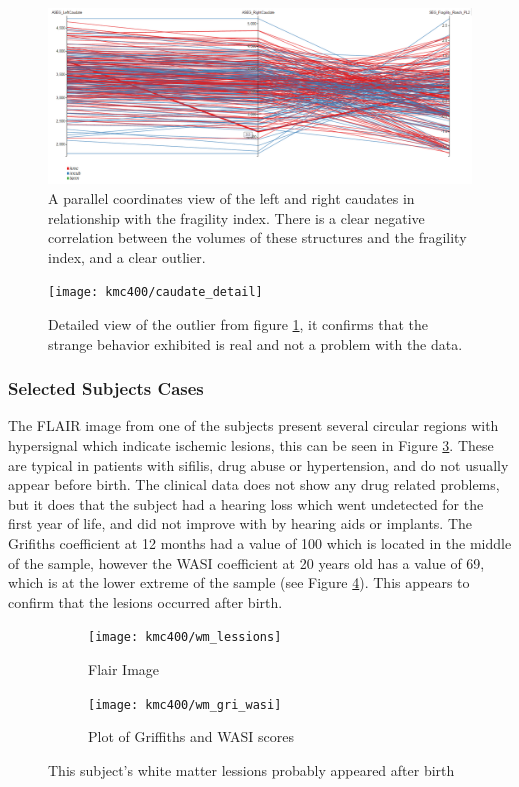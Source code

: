 \begin{figure}
	\centering
		\includegraphics[width=\textwidth]{figures/kmc400/caudate_parallel}
	\caption{A parallel coordinates view of the left and right caudates in relationship with the fragility index. There is a clear negative correlation between the volumes of these structures and the fragility index, and a clear outlier.}
	\label{fig_caudate_parallel}
\end{figure}


\begin{figure}
	\centering
		\texttt{[image: kmc400/caudate\_detail]}
	\caption{Detailed view of the outlier from figure \ref{fig_caudate_parallel}, it confirms that the strange behavior exhibited is real and not a problem with the data.}
	\label{fig_asymetric_caudate_detail}
\end{figure}

\subsubsection{Selected Subjects Cases}
 
The FLAIR image from one of the subjects present several circular regions with hypersignal which indicate ischemic lesions, this can be seen in Figure \ref{fig_white_matter_lessions_a}. These are typical in patients with sifilis, drug abuse or hypertension, and do not usually appear before birth. The clinical data does not show any drug related problems, but it does  that the subject had a hearing loss which went undetected for the first year of life, and did not improve with by hearing aids or implants. 
The Grifiths coefficient at 12 months had a value of 100 which is located in the middle of the sample, however the WASI coefficient at 20 years old has a value of 69, which is at the lower extreme of the sample (see Figure \ref{fig_white_matter_lessions_b}). This appears to confirm that the lesions occurred after birth.

\begin{figure}
	\centering
	\begin{subfigure}{0.45\textwidth}
		\texttt{[image: kmc400/wm\_lessions]}
		\caption{Flair Image 	\label{fig_white_matter_lessions_a}}
	\end{subfigure}
	\begin{subfigure}{0.45\textwidth}
		\texttt{[image: kmc400/wm\_gri\_wasi]}
		\caption{Plot of Griffiths and WASI scores 	\label{fig_white_matter_lessions_b}}
	\end{subfigure}
	\caption{This subject's white matter lessions probably appeared after birth}
	\label{fig_white_matter_lessions}
\end{figure}


